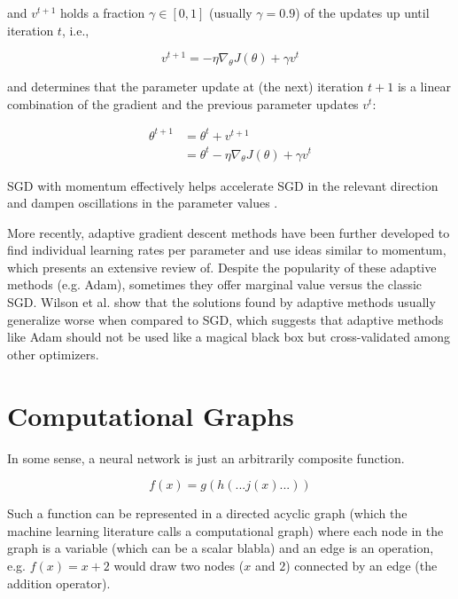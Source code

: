 and $v^{t+1}$ holds a fraction $\gamma \in [0,1]$ (usually $\gamma = 0.9$) of the updates up until iteration $t$, i.e.,

$$
v^{t+1} = -\eta \nabla_{\theta} J(\theta) + \gamma v^{t}
$$

and determines that the parameter update at (the next) iteration $t+1$ is a linear combination of the gradient and the previous parameter updates $v^{t}$:

\begin{align*}
    \theta^{t+1} &= \theta^{t} + v^{t+1} \\
                 &= \theta^{t} - \eta \nabla_{\theta} J(\theta) + \gamma v^{t}
\end{align*}

\ac{SGD} with momentum effectively helps accelerate \ac{SGD} in the relevant direction and dampen oscillations in the parameter values \cite{ruder2016}.

More recently, adaptive gradient descent methods have been further developed to find individual learning rates per parameter and use ideas similar to momentum, which \citeauthor{ruder2016} \cite{ruder2016} presents an extensive review of. Despite the popularity of these adaptive methods (e.g. Adam), sometimes they offer marginal value versus the classic \ac{SGD}. Wilson et al. \cite{wilson2017} show that the solutions found by adaptive methods usually generalize worse when compared to \ac{SGD}, which suggests that adaptive methods like Adam should not be used like a magical black box but cross-validated among other optimizers.

\section{Computational Graphs}

In some sense, a neural network is just an arbitrarily composite function.

$$
f(x) = g(h( ... j(x) ... ))
$$

Such a function can be represented in a directed acyclic graph (which the machine learning literature calls a computational graph) where each node in the graph is a variable (which can be a scalar blabla) and an edge is an operation, e.g. $f(x) = x+2$ would draw two nodes ($x$ and $2$) connected by an edge (the addition operator).

